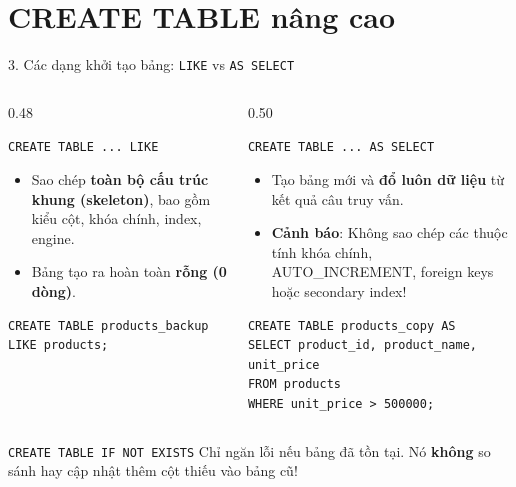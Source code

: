 \documentclass[aspectratio=169,11pt]{beamer}
\newcommand{\kw}[1]{\textcolor{dbblue}{\textbf{#1}}}
\newcommand{\smallgap}{\vspace{0.2em}}
\begin{document}
\section{CREATE TABLE nâng cao}
\begin{frame}[fragile]{3. Các dạng khởi tạo bảng: \texttt{LIKE} vs \texttt{AS SELECT}}
\begin{columns}[t]
  \begin{column}{0.48\textwidth}
    \begin{block}{\texttt{CREATE TABLE ... LIKE}}
      \begin{itemize}\setlength{\itemsep}{1.5pt}
        \item Sao chép \kw{toàn bộ cấu trúc khung (skeleton)}, bao gồm kiểu cột, khóa chính, index, engine.
        \item Bảng tạo ra hoàn toàn \kw{rỗng (0 dòng)}.
      \end{itemize}
    \end{block}
\begin{lstlisting}
CREATE TABLE products_backup 
LIKE products;
\end{lstlisting}
  \end{column}
  \begin{column}{0.50\textwidth}
    \begin{block}{\texttt{CREATE TABLE ... AS SELECT}}
      \begin{itemize}\setlength{\itemsep}{1.5pt}
        \item Tạo bảng mới và \kw{đổ luôn dữ liệu} từ kết quả câu truy vấn.
        \item \kw{Cảnh báo}: Không sao chép các thuộc tính khóa chính, AUTO\_INCREMENT, foreign keys hoặc secondary index!
      \end{itemize}
    \end{block}
\begin{lstlisting}
CREATE TABLE products_copy AS 
SELECT product_id, product_name, unit_price 
FROM products 
WHERE unit_price > 500000;
\end{lstlisting}
  \end{column}
\end{columns}

\smallgap
\begin{exampleblock}{\texttt{CREATE TABLE IF NOT EXISTS}}
  Chỉ ngăn lỗi nếu bảng đã tồn tại. Nó \textbf{không} so sánh hay cập nhật thêm cột thiếu vào bảng cũ!
\end{exampleblock}
\end{frame}
\end{document}
